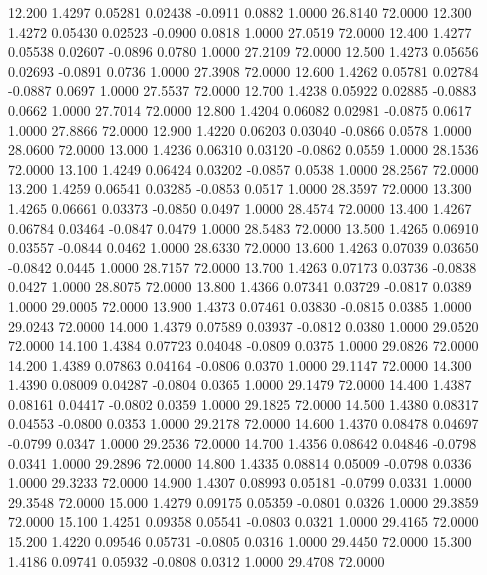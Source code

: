   12.200   1.4297   0.05281   0.02438  -0.0911   0.0882   1.0000  26.8140  72.0000
  12.300   1.4272   0.05430   0.02523  -0.0900   0.0818   1.0000  27.0519  72.0000
  12.400   1.4277   0.05538   0.02607  -0.0896   0.0780   1.0000  27.2109  72.0000
  12.500   1.4273   0.05656   0.02693  -0.0891   0.0736   1.0000  27.3908  72.0000
  12.600   1.4262   0.05781   0.02784  -0.0887   0.0697   1.0000  27.5537  72.0000
  12.700   1.4238   0.05922   0.02885  -0.0883   0.0662   1.0000  27.7014  72.0000
  12.800   1.4204   0.06082   0.02981  -0.0875   0.0617   1.0000  27.8866  72.0000
  12.900   1.4220   0.06203   0.03040  -0.0866   0.0578   1.0000  28.0600  72.0000
  13.000   1.4236   0.06310   0.03120  -0.0862   0.0559   1.0000  28.1536  72.0000
  13.100   1.4249   0.06424   0.03202  -0.0857   0.0538   1.0000  28.2567  72.0000
  13.200   1.4259   0.06541   0.03285  -0.0853   0.0517   1.0000  28.3597  72.0000
  13.300   1.4265   0.06661   0.03373  -0.0850   0.0497   1.0000  28.4574  72.0000
  13.400   1.4267   0.06784   0.03464  -0.0847   0.0479   1.0000  28.5483  72.0000
  13.500   1.4265   0.06910   0.03557  -0.0844   0.0462   1.0000  28.6330  72.0000
  13.600   1.4263   0.07039   0.03650  -0.0842   0.0445   1.0000  28.7157  72.0000
  13.700   1.4263   0.07173   0.03736  -0.0838   0.0427   1.0000  28.8075  72.0000
  13.800   1.4366   0.07341   0.03729  -0.0817   0.0389   1.0000  29.0005  72.0000
  13.900   1.4373   0.07461   0.03830  -0.0815   0.0385   1.0000  29.0243  72.0000
  14.000   1.4379   0.07589   0.03937  -0.0812   0.0380   1.0000  29.0520  72.0000
  14.100   1.4384   0.07723   0.04048  -0.0809   0.0375   1.0000  29.0826  72.0000
  14.200   1.4389   0.07863   0.04164  -0.0806   0.0370   1.0000  29.1147  72.0000
  14.300   1.4390   0.08009   0.04287  -0.0804   0.0365   1.0000  29.1479  72.0000
  14.400   1.4387   0.08161   0.04417  -0.0802   0.0359   1.0000  29.1825  72.0000
  14.500   1.4380   0.08317   0.04553  -0.0800   0.0353   1.0000  29.2178  72.0000
  14.600   1.4370   0.08478   0.04697  -0.0799   0.0347   1.0000  29.2536  72.0000
  14.700   1.4356   0.08642   0.04846  -0.0798   0.0341   1.0000  29.2896  72.0000
  14.800   1.4335   0.08814   0.05009  -0.0798   0.0336   1.0000  29.3233  72.0000
  14.900   1.4307   0.08993   0.05181  -0.0799   0.0331   1.0000  29.3548  72.0000
  15.000   1.4279   0.09175   0.05359  -0.0801   0.0326   1.0000  29.3859  72.0000
  15.100   1.4251   0.09358   0.05541  -0.0803   0.0321   1.0000  29.4165  72.0000
  15.200   1.4220   0.09546   0.05731  -0.0805   0.0316   1.0000  29.4450  72.0000
  15.300   1.4186   0.09741   0.05932  -0.0808   0.0312   1.0000  29.4708  72.0000
